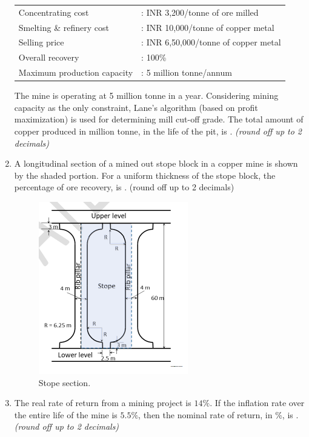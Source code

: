 \documentclass[journal]{IEEEtran}
\begin{document}
\begin{enumerate}[leftmargin=0pt]

\noindent
\begin{tabular}{@{}l l@{}}
Concentrating cost &: INR 3,200/tonne of ore milled \\
Smelting \& refinery cost &: INR 10,000/tonne of copper metal \\
Selling price &: INR 6,50,000/tonne of copper metal \\
Overall recovery &: 100\% \\
Maximum production capacity &: 5 million tonne/annum \\
\end{tabular}

\medskip
The mine is operating at 5 million tonne in a year. Considering mining capacity as the only
constraint, Lane's algorithm (based on profit maximization) is used for determining mill
cut-off grade. The total amount of copper produced in million tonne, in the life of the pit, is
\underline{\hspace{1.5cm}}. \textit{(round off up to 2 decimals)}

\hfill{}
\item A longitudinal section of a mined out stope block in a copper mine is shown by the shaded portion. For a uniform thickness of the stope block, the percentage of ore recovery, is \underline{\hspace{1.5cm}}. (round off up to 2 decimals)
\begin{figure}[h!]
\centering
\includegraphics[width=0.5\linewidth]{figs/section.png}
\caption{Stope section.}
\label{fig:stope}
\end{figure}
\hfill{}
\item The real rate of return from a mining project is $14\%$. If the inflation rate over the entire life of the mine is $5.5\%$, then the nominal rate of return, in \%, is \underline{\hspace{1.5cm}}. \textit{(round off up to 2 decimals)}


\end{enumerate}
\end{document}
